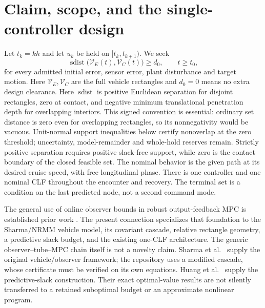\documentclass[10pt,letterpaper]{article}
\newcommand{\dist}{\operatorname{sdist}}
\begin{document}
\section{Claim, scope, and the single-controller design}
Let $t_k=kh$ and let $u_k$ be held on $[t_k,t_{k+1})$. We seek
\begin{equation}\label{eq:goal}
\dist\bigl(\mathcal V_E(t),\mathcal V_C(t)\bigr)\ge d_0,
\qquad t\ge t_0,
\end{equation}
for every admitted initial error, sensor error, plant disturbance and target
motion. Here $\mathcal V_E,\mathcal V_C$ are the full vehicle rectangles and
$d_0=0$ means no extra design clearance. Here $\operatorname{sdist}$
is positive Euclidean separation for disjoint rectangles, zero at contact,
and negative minimum translational penetration depth for overlapping
interiors. This signed convention is essential: ordinary set distance is
zero even for overlapping rectangles, so its nonnegativity would be vacuous.
Unit-normal support inequalities below certify nonoverlap at the zero
threshold; uncertainty, model-remainder and whole-hold reserves remain.
Strictly positive separation requires positive slack-free support, while
zero is the contact boundary of the closed feasible set.
The nominal behavior is the given path at its desired cruise speed, with free
longitudinal phase. There is one controller and one nominal CLF throughout the
encounter and recovery. The terminal set is a condition on the last predicted
node, not a second command mode.

The general use of online observer bounds in robust output-feedback MPC is
established prior work \cite{Kohler}. The present connection specializes that
foundation to the Sharma/NRMM vehicle model, its covariant cascade, relative
rectangle geometry, a predictive slack budget, and the existing one-CLF
architecture. The generic observer--tube--MPC chain itself is not a novelty claim.
Sharma et al.\ \cite{Sharma} supply the original vehicle/observer framework;
the repository uses a modified cascade, whose certificate must be verified on
its own equations. Huang et al.\ \cite{Huang} supply the predictive-slack
construction. Their exact optimal-value results are not silently transferred to
a retained suboptimal budget or an approximate nonlinear program.
\end{document}
